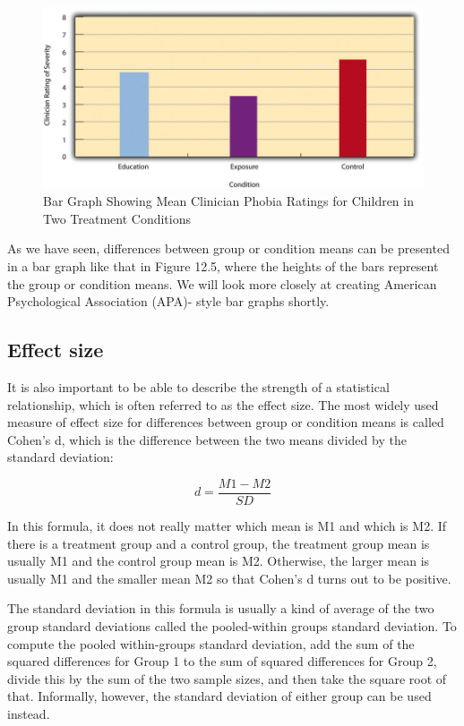 \begin{figure}

\includegraphics[width=.7\linewidth]{figures/Fig12-5}

\caption{Bar Graph Showing Mean Clinician Phobia Ratings for Children in Two Treatment Conditions}

\label{fig:bar}

\end{figure}

As we have seen, differences between group or condition means can be presented in a bar graph like that in Figure 12.5, where the heights of the bars represent the group or condition means. We will look more closely at creating American Psychological Association (APA)- style bar graphs shortly.

\subsection{Effect size}
It is also important to be able to describe the strength of a statistical relationship, which is often referred to as the effect size. The most widely used measure of effect size for differences between group or condition means is called Cohen's d, which is the difference between the two means divided by the standard deviation:

\begin{equation}
d = \frac{M1 -M2}{SD}
\end{equation}

In this formula, it does not really matter which mean is M1 and which is M2. If there is a treatment group and
a control group, the treatment group mean is usually M1 and the control group mean is M2. Otherwise, the larger mean is usually M1 and the smaller mean M2 so that Cohen's d turns out to be positive.

The standard deviation in this formula is usually a kind of average of the two group standard deviations called the pooled-within groups standard deviation. To compute the pooled within-groups standard deviation, add the sum of the squared differences for Group 1 to the sum of squared differences for Group 2, divide this by the sum of the two sample sizes, and then take the square root of that. Informally, however, the standard deviation of either group can be used instead.


